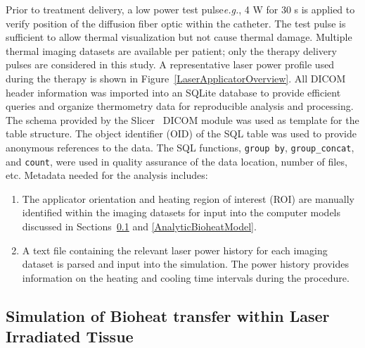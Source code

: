 \documentclass[12pt]{article}
\begin{document}
Prior to treatment delivery, a low power test pulse\textemdash\textit{e.g.}, 4 W for 30 s\textemdash
is applied to verify position of the diffusion fiber optic within the catheter.  
The test pulse is
sufficient to allow thermal visualization but not cause thermal damage. 
Multiple thermal imaging datasets are available per patient;
only the therapy delivery pulses are considered in this study.
A representative laser power profile used
during the therapy is shown in Figure~\ref{LaserApplicatorOverview}. 
All DICOM header information was imported into an SQLite database 
to provide efficient queries and 
organize thermometry data for reproducible analysis and processing. 
The schema provided by the Slicer~\cite{yeniaras2013design} DICOM
module was used as template for the table structure.
The object identifier (OID)
of the SQL table was used to provide anonymous references to the data.
The SQL functions,  \verb#group by#, \verb#group_concat#, and \verb#count#,
were used in quality assurance of the data
location, number of files, etc.
Metadata needed for the analysis includes:
\begin{enumerate}
\item The applicator orientation and heating region of interest (ROI)
are manually identified within the imaging datasets for input into the
computer models discussed in Sections~\ref{BioheatComputerModel} and \ref{AnalyticBioheatModel}.
\item A text file containing the relevant laser power history for each imaging
dataset is parsed and input into the simulation. The power history provides
information on the heating and cooling time intervals during the procedure.
\end{enumerate}



\subsection{Simulation of Bioheat transfer within Laser Irradiated Tissue}\label{BioheatComputerModel}
\end{document}
